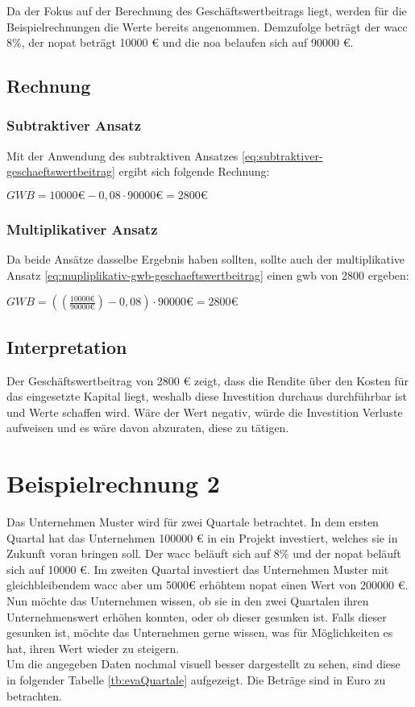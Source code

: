 Da der Fokus auf der Berechnung des Geschäftswertbeitrags liegt, werden für die Beispielrechnungen die Werte bereits angenommen. Demzufolge beträgt der \ac{wacc} 8\%, der \ac{nopat} beträgt 10000 € und die \ac{noa} belaufen sich auf 90000 €.

\subsection{Rechnung}

\subsubsection{Subtraktiver Ansatz}

Mit der Anwendung des subtraktiven Ansatzes \eqref{eq:subtraktiver-geschaeftswertbeitrag} ergibt sich folgende Rechnung:

\bigskip
$GWB = 10000 \text{€} - 0,08 \cdot 90000 \text{€} = 2800 \text{€}$


\subsubsection{Multiplikativer Ansatz}

Da beide Ansätze dasselbe Ergebnis haben sollten, sollte auch der multiplikative Ansatz \eqref{eq:mupliplikativ-gwb-geschaeftswertbeitrag} einen \ac{gwb} von 2800 ergeben:

\bigskip
$GWB = ((\frac{10000 \text{€}}{90000 \text{€}}) - 0,08) \cdot 90000 \text{€} = 2800 \text{€}$

\subsection{Interpretation}

Der Geschäftswertbeitrag von 2800 € zeigt, dass die Rendite über den Kosten für das eingesetzte Kapital liegt, weshalb diese Investition durchaus durchführbar ist und Werte schaffen wird. Wäre der Wert negativ, würde die Investition Verluste aufweisen und es wäre davon abzuraten, diese zu tätigen.

\section{Beispielrechnung 2}

Das Unternehmen Muster wird für zwei Quartale betrachtet. In dem ersten Quartal hat das Unternehmen 100000 € in ein Projekt investiert, welches sie in Zukunft voran bringen soll. Der \ac{wacc} beläuft sich auf 8\% und der \ac{nopat} beläuft sich auf 10000 €. Im zweiten Quartal investiert das Unternehmen Muster mit gleichbleibendem \ac{wacc} aber um 5000€ erhöhtem \ac{nopat} einen Wert von 200000 €. Nun möchte das Unternehmen wissen, ob sie in den zwei Quartalen ihren Unternehmenswert erhöhen konnten, oder ob dieser gesunken ist. Falls dieser gesunken ist, möchte das Unternehmen gerne wissen, was für Möglichkeiten es hat, ihren Wert wieder zu steigern.\\
Um die angegeben Daten nochmal visuell besser dargestellt zu sehen, sind diese in folgender Tabelle \eqref{tb:evaQuartale} aufgezeigt. Die Beträge sind in Euro zu betrachten.

